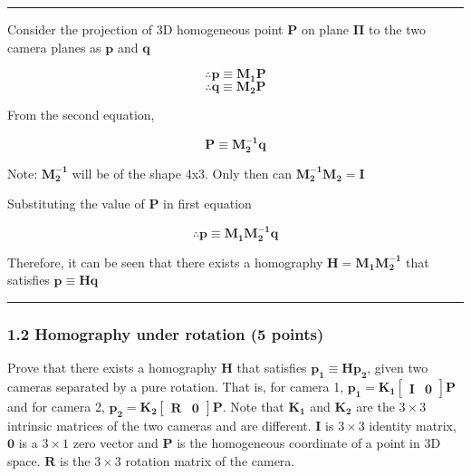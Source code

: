 \documentclass[11pt]{article}
\begin{document}
    \begin{center}\rule{0.5\linewidth}{0.5pt}\end{center}

Consider the projection of 3D homogeneous point \(\mathbf{P}\) on plane
\(\mathbf{\Pi}\) to the two camera planes as \(\mathbf{p}\) and
\(\mathbf{q}\)

\[\therefore \mathbf{p \equiv M_1P}\]
\[\therefore \mathbf{q \equiv M_2P}\]

From the second equation,

\[\mathbf{P \equiv M_2^{-1}q}\]

Note: \(\mathbf{M_2^{-1}}\) will be of the shape 4x3. Only then can
\(\mathbf{M_2^{-1}M_2 = I}\)

Substituting the value of \(\mathbf{P}\) in first equation

\[\therefore \mathbf{p \equiv M_1M_2^{-1}q}\]

Therefore, it can be seen that there exists a homography
\(\mathbf{H = M_1M_2^{-1}}\) that satisfies \(\mathbf{p \equiv Hq}\)

\begin{center}\rule{0.5\linewidth}{0.5pt}\end{center}

    \hypertarget{homography-under-rotation-5-points}{%
\subsubsection{1.2 Homography under rotation (5
points)}\label{homography-under-rotation-5-points}}

Prove that there exists a homography \(\mathbf{H}\) that satisfies
\(\mathbf{p_1} \equiv \mathbf{Hp_2}\), given two cameras separated by a
pure rotation. That is, for camera 1,
\(\mathbf{p_1} = \mathbf{K_1} \begin{bmatrix} \mathbf{I} & \mathbf{0} \end{bmatrix} \mathbf{P}\)
and for camera 2,
\(\mathbf{p_2} = \mathbf{K_2} \begin{bmatrix}\mathbf{R} & \mathbf{0} \end{bmatrix} \mathbf{P}\).
Note that \(\mathbf{K_1}\) and \(\mathbf{K_2}\) are the \(3 \times 3\)
intrinsic matrices of the two cameras and are different. \(\mathbf{I}\)
is \(3 \times 3\) identity matrix, \(\mathbf{0}\) is a \(3\times1\) zero
vector and \(\mathbf{P}\) is the homogeneous coordinate of a point in 3D
space. \(\mathbf{R}\) is the \(3 \times 3\) rotation matrix of the
camera.
\end{document}
